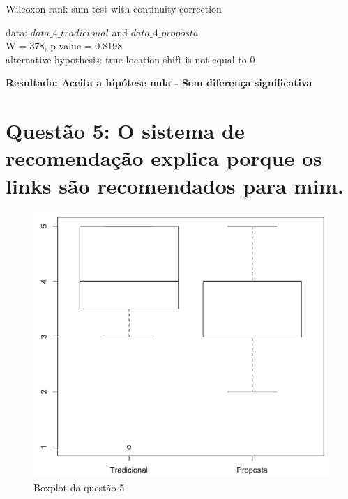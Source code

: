 Wilcoxon rank sum test with continuity correction

\noindent
data:  $data\_4\_tradicional$ and $data\_4\_proposta$\\
W = 378, p-value = 0.8198\\
alternative hypothesis: true location shift is not equal to 0

\noindent
\textbf{Resultado: Aceita a hipótese nula - Sem diferença significativa}

\newpage
\section{Questão 5: O sistema de recomendação explica porque os links são recomendados para mim.}

\begin{figure}[htb]
  \caption{\label{fig:questao5-boxplot}Boxplot da questão 5}
  \begin{center}
      \includegraphics[scale=0.4]{./Figuras/questao5-boxplot.png}
  \end{center}
\end{figure}

